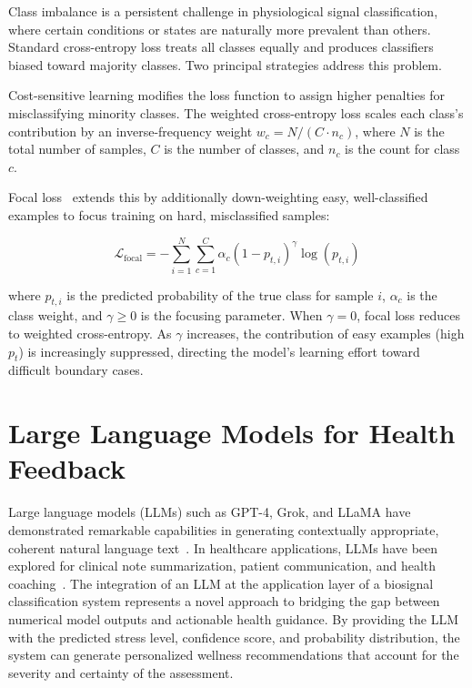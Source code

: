 \documentclass[12pt,letterpaper]{report}
\begin{document}
Class imbalance is a persistent challenge in physiological signal classification, where certain conditions or states are naturally more prevalent than others. Standard cross-entropy loss treats all classes equally and produces classifiers biased toward majority classes. Two principal strategies address this problem.

Cost-sensitive learning modifies the loss function to assign higher penalties for misclassifying minority classes. The weighted cross-entropy loss scales each class's contribution by an inverse-frequency weight $w_c = N / (C \cdot n_c)$, where $N$ is the total number of samples, $C$ is the number of classes, and $n_c$ is the count for class $c$.

Focal loss~\cite{lin2017} extends this by additionally down-weighting easy, well-classified examples to focus training on hard, misclassified samples:

\begin{equation}
\label{eq:focal}
\mathcal{L}_{\text{focal}} = -\sum_{i=1}^{N}\sum_{c=1}^{C} \alpha_c (1 - p_{t,i})^{\gamma} \log(p_{t,i})
\end{equation}

\noindent where $p_{t,i}$ is the predicted probability of the true class for sample $i$, $\alpha_c$ is the class weight, and $\gamma \geq 0$ is the focusing parameter. When $\gamma = 0$, focal loss reduces to weighted cross-entropy. As $\gamma$ increases, the contribution of easy examples (high $p_t$) is increasingly suppressed, directing the model's learning effort toward difficult boundary cases.

\section{Large Language Models for Health Feedback}
\label{sec:llm}

Large language models (LLMs) such as GPT-4, Grok, and LLaMA have demonstrated remarkable capabilities in generating contextually appropriate, coherent natural language text~\cite{brown2020}. In healthcare applications, LLMs have been explored for clinical note summarization, patient communication, and health coaching~\cite{singhal2023}. The integration of an LLM at the application layer of a biosignal classification system represents a novel approach to bridging the gap between numerical model outputs and actionable health guidance. By providing the LLM with the predicted stress level, confidence score, and probability distribution, the system can generate personalized wellness recommendations that account for the severity and certainty of the assessment.
\end{document}
